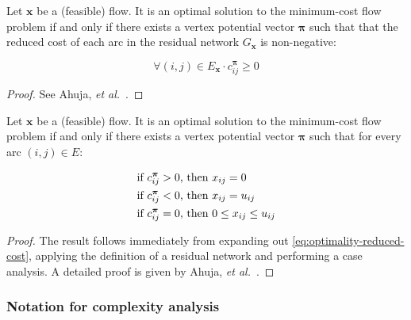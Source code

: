 \begin{thm} \label{thm:optimality-reduced-cost}
Let $\mathbf{x}$ be a (feasible) flow. It is an optimal solution to the minimum-cost flow problem if and only if there exists a vertex potential vector $\boldsymbol{\pi}$ such that that the reduced cost of each arc in the residual network $G_{\mathbf{x}}$ is non-negative:

\begin{equation} \label{eq:optimality-reduced-cost}
\forall(i,j)\in E_{\mathbf{x}}\cdot c_{ij}^{\boldsymbol{\pi}}\geq 0
\end{equation}
\end{thm}
\begin{proof}
See Ahuja, \textit{et al.}~\cite[p.~309]{Ahuja:1993}.
\end{proof}

\begin{thm} \label{thm:optimality-complementary-slackness}
Let $\mathbf{x}$ be a (feasible) flow. It is an optimal solution to the minimum-cost flow problem if and only if there exists a vertex potential vector $\boldsymbol{\pi}$ such that for every arc $(i,j)\in E$:

\normalfont %
\begin{subequations} \label{eq:optimality-complementary-slackness}
\begin{align} 
\text{if \ensuremath{c_{ij}^{\boldsymbol{\pi}}>0}, } & \text{then \ensuremath{x_{ij}=0}} \\
\text{if \ensuremath{c_{ij}^{\boldsymbol{\pi}}<0}, } & \text{then \ensuremath{x_{ij}=u_{ij}}} \\
\text{if \ensuremath{c_{ij}^{\boldsymbol{\pi}}=0}, } & \text{then \ensuremath{0\leq x_{ij}\leq  u_{ij}}}
\end{align}
\end{subequations}
\end{thm}
\begin{proof}
The result follows immediately from expanding out \cref{eq:optimality-reduced-cost}, applying the definition of a residual network and performing a case analysis. A detailed proof is given by Ahuja, \textit{et al.}~\cite[p.~310]{Ahuja:1993}.
\end{proof}

\subsubsection{Notation for complexity analysis} \label{sec:prep-flow-complexity}


